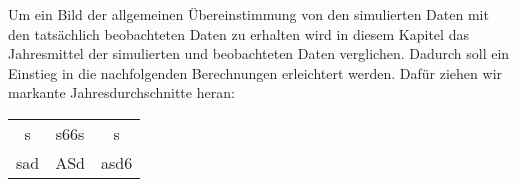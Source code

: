 Um ein Bild der allgemeinen Übereinstimmung von den simulierten Daten mit den tatsächlich beobachteten Daten zu erhalten wird in diesem Kapitel das Jahresmittel der simulierten und beobachteten Daten verglichen. Dadurch soll ein Einstieg in die nachfolgenden Berechnungen erleichtert werden. Dafür ziehen wir markante Jahresdurchschnitte heran:
\begin{table}[h]
	\begin{tabular}{|c|c|c|}
		s&s66s&s\\
		sad&ASd&asd6\\
	\end{tabular}
	
\end{table}